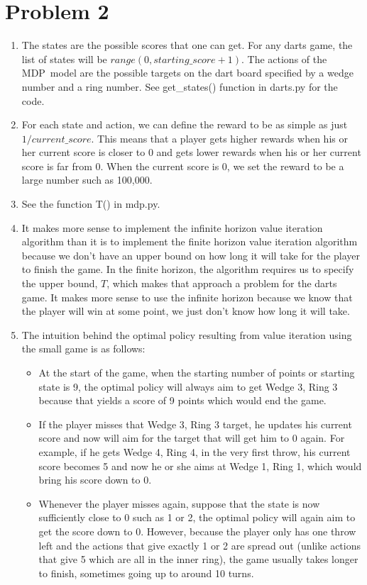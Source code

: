 \documentclass[12pt,letterpaper]{article}
\begin{document}
\section*{Problem 2}
\begin{enumerate}[label={(\alph*) }]
        \item The states are the possible scores that one can get. For any darts game, the list of states will be $range(0, starting\_score+1)$. The actions of the MDP\ model are the possible targets on the dart board specified by a wedge number and a ring number. See get\_states() function in darts.py for the code. 
        \item For each state and action, we can define the reward to be as simple as just $1/current\_score$. This means that a player gets higher rewards when his or her current score is closer to 0 and gets lower rewards when his or her current score is far from 0. When the current score is 0, we set the reward to be a large number such as 100,000.
        \item See the function T() in mdp.py.
        \item It makes more sense to implement the infinite horizon value iteration algorithm than it is to implement the finite horizon value iteration algorithm because we don't have an upper bound on how long it will take for the player to finish the game. In the finite horizon, the algorithm requires us to specify the upper bound, $T$, which makes that approach a problem for the darts game. It makes more sense to use the infinite horizon because we know that the player will win at some point, we just don't know how long it will take. 
        \item The intuition behind the optimal policy resulting from value iteration using the small game is as follows:
                \begin{itemize}
                        \item At the start of the game, when the starting number of points or starting state is 9, the optimal policy will always aim to get Wedge 3, Ring 3 because that yields a score of 9 points which would end the game. 
                        \item If the player misses that Wedge 3, Ring 3 target, he updates his current score and now  will aim for the target that will get him to 0 again. For example, if he gets Wedge 4, Ring 4, in the very first throw, his current score becomes 5 and now he or she aims at Wedge 1, Ring 1, which would bring his score down to 0. 
                        \item Whenever the player misses again, suppose that the state is now sufficiently close to 0 such as 1 or 2, the optimal policy will again aim to get the score down to 0. However, because the player only has one throw left and the actions that give exactly 1 or 2 are spread out (unlike actions that give 5 which are all in the inner ring), the game usually takes longer to finish, sometimes going up to around 10 turns.  

\end{itemize}
\end{enumerate}
\end{document}
